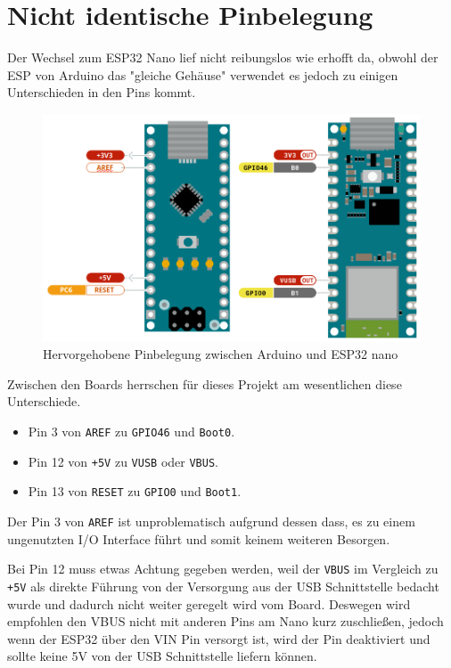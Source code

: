 \section{Nicht identische Pinbelegung}
\label{subsec:arduino_to_esp32}
Der Wechsel zum ESP32 Nano lief nicht reibungslos wie erhofft da,
obwohl der ESP von Arduino das "gleiche Gehäuse" verwendet 
es jedoch zu einigen Unterschieden in den Pins kommt. 

\begin{figure}[H]
    \includegraphics[width=\textwidth, center]{img/nano-differences-m.png}
    \caption{Hervorgehobene Pinbelegung zwischen Arduino und ESP32 nano}
    \label{fig:nano_boards}
\end{figure}

Zwischen den Boards herrschen für dieses Projekt am wesentlichen diese Unterschiede.
\begin{itemize}
    \item Pin 3 von \texttt{AREF} zu \texttt{GPIO46} und \texttt{Boot0}.
    \item Pin 12 von \texttt{+5V} zu \texttt{VUSB} oder \texttt{VBUS}.
    \item Pin 13 von \texttt{RESET} zu \texttt{GPIO0} und \texttt{Boot1}.
\end{itemize}

Der Pin 3 von \texttt{AREF} ist unproblematisch aufgrund dessen dass,
es zu einem ungenutzten I/O Interface führt und somit keinem weiteren Besorgen.

Bei Pin 12 muss etwas Achtung gegeben werden, weil der \texttt{VBUS} im Vergleich zu \texttt{+5V} als
direkte Führung von der Versorgung aus der USB Schnittstelle bedacht wurde und 
dadurch nicht weiter geregelt wird vom Board. Deswegen wird empfohlen den VBUS 
nicht mit anderen Pins am Nano kurz zuschließen, jedoch wenn der ESP32 über den VIN Pin versorgt ist, 
wird der Pin deaktiviert und sollte keine 5V von der USB Schnittstelle liefern können. 

